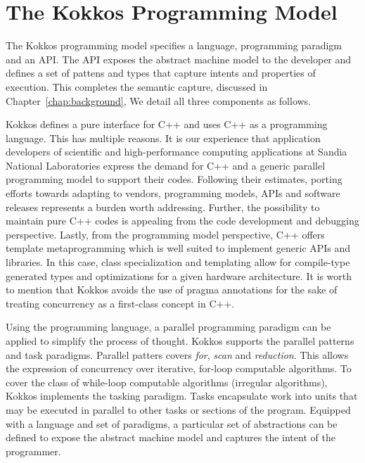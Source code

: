 \section{The Kokkos Programming Model}\label{chap:kokkosPM}

The Kokkos programming model specifies a language, programming paradigm and an API. The API exposes the abstract machine model to the developer and defines a set of pattens and types that capture intents and properties of execution. This completes the semantic capture, discussed in Chapter~\ref{chap:background}, We detail all three components as follows.

Kokkos defines a pure interface for C++ and uses C++ as a programming language. This has multiple reasons. It is our experience that application developers of scientific and high-performance computing applications at Sandia National Laboratories express the demand for C++ and a generic parallel programming model to support their codes. Following their estimates, porting efforts towards adapting to vendors, programming models, APIs and software releases represents a burden worth addressing. Further, the possibility to maintain pure C++ codes is appealing from the code development and debugging perspective. 
Lastly, from the programming model perspective, C++ offers template metaprogramming which is well suited to implement generic APIs and libraries. In this case, class specialization and templating allow for compile-type generated types and optimizations for a given hardware architecture. It is worth to mention that Kokkos avoids the use of pragma annotations for the sake of treating concurrency as a first-class concept in C++.

Using the programming language, a parallel programming paradigm can be applied to simplify the process of thought. Kokkos supports the parallel patterns and task paradigms. Parallel patters covers \emph{for}, \emph{ scan} and \emph{reduction}. This allows the expression of concurrency over iterative, for-loop computable algorithms. To cover the class of while-loop computable algorithms (irregular algorithms), Kokkos implements the tasking paradigm. Tasks encapsulate work into units that may be executed in parallel to other tasks or sections of the program. Equipped with a language and set of paradigms, a particular set of abstractions can be defined to expose the abstract machine model and captures the intent of the programmer.

